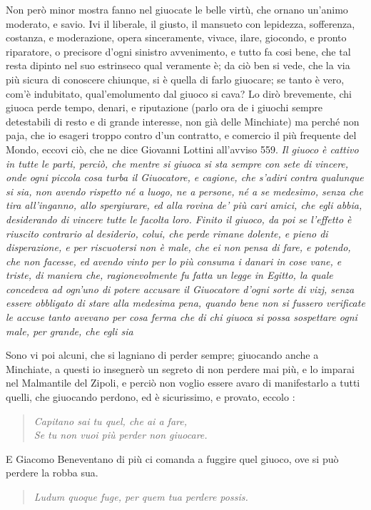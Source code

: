 \documentclass[11pt,a6paper]{article}
\newcommand{\literaryquote}[1]{%
\kern -6pt  \begin{verse}
    {\footnotesize \it #1}
  \end{verse}\kern -2pt%
}
\begin{document}
{Non però minor mostra fanno nel giuocate le
belle virtù, che ornano un'animo moderato, e
savio. Ivi il liberale, il giusto, il mansueto con
lepidezza, sofferenza, costanza, e moderazione, opera
sinceramente, vivace, ilare, giocondo, e pronto
riparatore, o precisore d'ogni sinistro avvenimento,
e tutto fa cosi bene, che tal resta dipinto nel suo
estrinseco qual veramente è; da ciò ben si vede, che
la via più sicura di conoscere chiunque, si è quella di
farlo giuocare; se tanto è vero, com'è indubitato,
qual'emolumento dal giuoco si cava? Lo dirò
brevemente, chi giuoca perde tempo, denari, e
riputazione (parlo ora de i giuochi sempre detestabili di
resto e di grande interesse, non già delle
Minchiate) ma perché non paja, che io esageri troppo
contro d'un contratto, e comercio il più frequente del
Mondo, eccovi ciò, che ne dice Giovanni Lottini
all'avviso 559. \textit{Il giuoco è cattivo in tutte le parti,
perciò, che mentre si giuoca si sta sempre con sete di
vincere, onde ogni piccola cosa turba il Giuocatore,
e cagione, che s'adiri contra qualunque si sia, non
avendo rispetto né a luogo, ne a persone, né a se
medesimo, senza che tira all'inganno, allo
spergiurare, ed alla rovina de' più cari amici, che egli abbia,
desiderando di vincere tutte le facolta loro. Finito il
giuoco, da poi se l'effetto è riuscito contrario al
desiderio, colui, che perde rimane dolente, e pieno di
disperazione, e per riscuotersi non è male, che ei non
pensa di fare, e potendo, che non facesse, ed avendo
vinto per lo più consuma i danari in cose vane, e
triste, di maniera che, ragionevolmente fu fatta un
legge in Egitto, la quale concedeva ad ogn'uno di
potere accusare il Giuocatore d'ogni sorte di vizj,
senza essere obbligato di stare alla medesima pena,
quando bene non si fussero verificate le accuse tanto
avevano per cosa ferma che di chi giuoca si possa
sospettare ogni male, per grande, che egli sia}

Sono vi poi alcuni, che si lagniano di perder
sempre; giuocando anche a Minchiate, a questi io
insegnerò un segreto di non perdere mai più, e lo
imparai nel Malmantile del Zipoli, e perciò non
voglio essere avaro di manifestarlo a tutti quelli, che
giuocando perdono, ed è sicurissimo, e provato,
eccolo :
\literaryquote{Capitano sai tu quel, che ai a fare, \\
 Se tu non vuoi più perder non giuocare.}

E Giacomo Beneventano di più ci comanda a fuggire
quel giuoco, ove si può perdere la robba sua.
\literaryquote{
Ludum quoque fuge, per quem tua perdere possis.}

}
\end{document}
